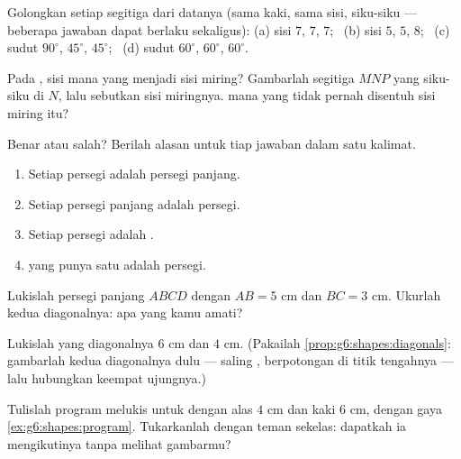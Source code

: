 \begin{exercise}[$\star$]\label{exo:g6:shapes:4}
Golongkan setiap segitiga dari datanya (sama kaki, sama sisi,
siku-siku --- beberapa jawaban dapat berlaku sekaligus):
(a) sisi $7$, $7$, $7$; \
(b) sisi $5$, $5$, $8$; \
(c) sudut $90^\circ$, $45^\circ$, $45^\circ$; \
(d) sudut $60^\circ$, $60^\circ$, $60^\circ$.
\end{exercise}

\begin{exercise}[$\star$]\label{exo:g6:shapes:5}
Pada , sisi mana yang menjadi sisi miring?
Gambarlah segitiga $MNP$ yang siku-siku di $N$, lalu sebutkan sisi
miringnya.  mana yang tidak pernah disentuh sisi miring itu?
\end{exercise}

\begin{exercise}[$\star$]\label{exo:g6:shapes:6}
Benar atau salah? Berilah alasan untuk tiap jawaban dalam satu kalimat.
\begin{enumerate}
  \item Setiap persegi adalah persegi panjang.
  \item Setiap persegi panjang adalah persegi.
  \item Setiap persegi adalah .
  \item {} yang punya satu  adalah persegi.
\end{enumerate}
\end{exercise}

\begin{exercise}[$\star$]\label{exo:g6:shapes:7}
Lukislah persegi panjang $ABCD$ dengan $AB = 5$ cm dan $BC = 3$ cm.
Ukurlah kedua diagonalnya: apa yang kamu amati?
\end{exercise}

\begin{exercise}[$\star$]\label{exo:g6:shapes:8}
Lukislah  yang diagonalnya $6$ cm dan $4$ cm. (Pakailah
\cref{prop:g6:shapes:diagonals}: gambarlah kedua diagonalnya dulu ---
saling \omterm{def:g6:lines:perp}{tegak lurus}, berpotongan di titik tengahnya --- lalu hubungkan
keempat ujungnya.)
\end{exercise}

\begin{exercise}[$\star\star$]\label{exo:g6:shapes:9}
Tulislah program melukis untuk  dengan alas $4$ cm
dan kaki $6$ cm, dengan gaya \cref{ex:g6:shapes:program}. Tukarkanlah
dengan teman sekelas: dapatkah ia mengikutinya tanpa melihat gambarmu?
\end{exercise}

